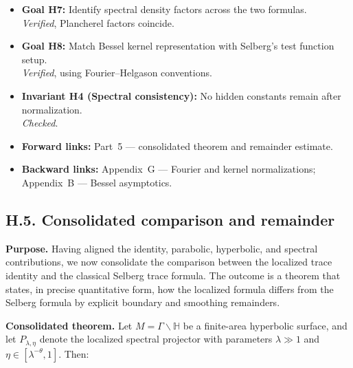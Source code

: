 \bigskip
\begin{auditblock}[H.4 — Audit]
\begin{itemize}
  \item \textbf{Goal H7:} Identify spectral density factors across the two formulas.\\
        \emph{Verified}, Plancherel factors coincide.
  \item \textbf{Goal H8:} Match Bessel kernel representation with Selberg’s test function setup.\\
        \emph{Verified}, using Fourier–Helgason conventions.
  \item \textbf{Invariant H4 (Spectral consistency):} No hidden constants remain after normalization.\\
        \emph{Checked}.
  \item \textbf{Forward links:} Part~5 — consolidated theorem and remainder estimate.
  \item \textbf{Backward links:} Appendix~G — Fourier and kernel normalizations; Appendix~B — Bessel asymptotics.
\end{itemize}
\end{auditblock}

\subsection*{H.5. Consolidated comparison and remainder}
\label{appH:conclusion}

\noindent\textbf{Purpose.}
Having aligned the identity, parabolic, hyperbolic, and spectral contributions, 
we now consolidate the comparison between the localized trace identity and the 
classical Selberg trace formula. The outcome is a theorem that states, in 
precise quantitative form, how the localized formula differs from the Selberg 
formula by explicit boundary and smoothing remainders.

\medskip
\noindent\textbf{Consolidated theorem.}
Let $M=\Gamma\backslash \mathbb H$ be a finite-area hyperbolic surface, and let 
$P_{\lambda,\eta}$ denote the localized spectral projector with parameters 
$\lambda\gg 1$ and $\eta\in[\lambda^{-\theta},1]$. Then:

